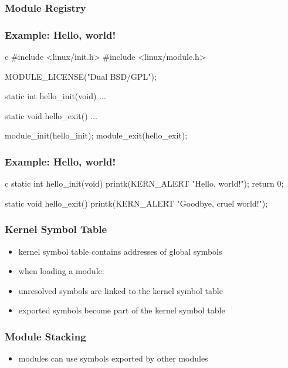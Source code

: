 \documentclass[dvipsnames]{beamer}
\begin{document}
\begin{frame}
  \frametitle{Module Registry}

  \begin{center}
  \end{center}
\end{frame}

\begin{frame}[fragile]
  \frametitle{Example: Hello, world!}

  \begin{pygments}{c}
#include <linux/init.h>
#include <linux/module.h>

MODULE_LICENSE("Dual BSD/GPL");

static int hello_init(void) { ... }

static void hello_exit() { ... }

module_init(hello_init);
module_exit(hello_exit);
  \end{pygments}
\end{frame}

\begin{frame}[fragile]
  \frametitle{Example: Hello, world!}

  \begin{pygments}{c}
static int hello_init(void)
{
    printk(KERN_ALERT "Hello, world!\n");
    return 0;
}

static void hello_exit()
{
    printk(KERN_ALERT "Goodbye, cruel world!\n");
}
  \end{pygments}
\end{frame}

\begin{frame}
  \frametitle{Kernel Symbol Table}

  \begin{itemize}
    \item kernel symbol table contains addresses of global symbols

    \bigskip
    \item when loading a module:
    \smallskip
    \item unresolved symbols are linked to the kernel symbol table
    \item exported symbols become part of the kernel symbol table
  \end{itemize}
\end{frame}

\begin{frame}
  \frametitle{Module Stacking}

  \begin{itemize}
    \item modules can use symbols exported by other modules
  \end{itemize}

  \begin{center}
  \end{center}
\end{frame}
\end{document}
